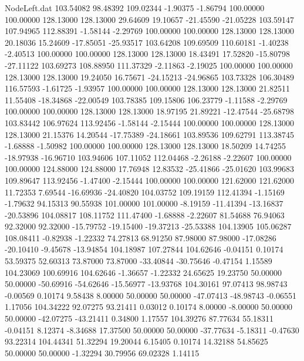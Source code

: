 \begin{filecontents}{NodeLeft.dat}
 103.54082   98.48392  109.02344    -1.90375   -1.86794  100.00000  100.00000  128.13000  128.13000   29.64609   19.10657  -21.45590  -21.05228
 103.59147  107.94965  112.88391    -1.58144   -2.29769  100.00000  100.00000  128.13000  128.13000   20.18036   15.24609  -17.85051  -25.93517
 103.64208  109.69509  110.60181    -1.40238   -2.40513  100.00000  100.00000  128.13000  128.13000   18.43491   17.52820  -15.80798  -27.11122
 103.69273  108.88950  111.37329    -2.11863   -2.19025  100.00000  100.00000  128.13000  128.13000   19.24050   16.75671  -24.15213  -24.96865
 103.73328  106.30489  116.57593    -1.61725   -1.93957  100.00000  100.00000  128.13000  128.13000   21.82511   11.55408  -18.34868  -22.00549
 103.78385  109.15806  106.23779    -1.11588   -2.29769  100.00000  100.00000  128.13000  128.13000   18.97195   21.89221  -12.47544  -25.68798
 103.83442  106.97624  113.92456    -1.58144   -2.15444  100.00000  100.00000  128.13000  128.13000   21.15376   14.20544  -17.75389  -24.18661
 103.89536  109.62791  113.38745    -1.68888   -1.50982  100.00000  100.00000  128.13000  128.13000   18.50209   14.74255  -18.97938  -16.96710
 103.94606  107.11052  112.04468    -2.26188   -2.22607  100.00000  100.00000  124.88000  124.88000   17.76948   12.83532  -25.41866  -25.01620
 103.99683  109.89647  113.92456    -1.47400   -2.15444  100.00000  100.00000  121.62000  121.62000   11.72353    7.69544  -16.69936  -24.40820
 104.03752  109.19159  112.41394    -1.15169   -1.79632   94.15313   90.55938  101.00000  101.00000   -8.19159  -11.41394  -13.16837  -20.53896
 104.08817  108.11752  111.47400    -1.68888   -2.22607   81.54688   76.94063   92.32000   92.32000  -15.79752  -19.15400  -19.37213  -25.53388
 104.13905  105.06287  108.08411    -0.82938   -1.22332   74.27813   68.91250   87.98000   87.98000  -17.08286  -20.10410   -9.45678  -13.94854
 104.18987  107.27844  104.62646    -0.04151    0.10174   53.59375   52.60313   73.87000   73.87000  -33.40844  -30.75646   -0.47154    1.15589
 104.23069  100.69916  104.62646    -1.36657   -1.22332   24.65625   19.23750   50.00000   50.00000  -50.69916  -54.62646  -15.56977  -13.93768
 104.30161   97.07413   98.98743    -0.00569    0.10174    9.58438    8.00000   50.00000   50.00000  -47.07413  -48.98743   -0.06551    1.17056
 104.34222   92.07275   93.21411     0.03012    0.10174    8.00000   -8.00000   50.00000   50.00000  -42.07275  -43.21411    0.34800    1.17557
 104.39276   87.77634   55.18311    -0.04151    8.12374   -8.34688   17.37500   50.00000   50.00000  -37.77634   -5.18311   -0.47630   93.22314
 104.44341   51.32294   19.20044     6.15405    0.10174   14.32188   54.85625   50.00000   50.00000   -1.32294   30.79956   69.02328    1.14115

\end{filecontents}
